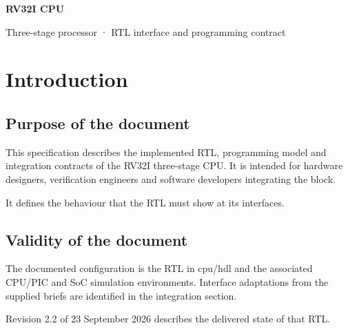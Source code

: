 \documentclass[11pt]{article}
\begin{document}
\begin{titlepage}\vspace*{24mm}
{\Huge\bfseries\color{accent}RV32I CPU\par}\vspace{4mm}{\LARGE Design Specification\par}\vspace{12mm}
{\Large Three-stage processor · RTL interface and programming contract\par}\vfill
{}\end{titlepage}
\tableofcontents
\clearpage
\section{Introduction}

\subsection{Purpose of the document}
\noindent This specification describes the implemented RTL, programming model and integration contracts of the RV32I three-stage CPU. It is intended for hardware designers, verification engineers and software developers integrating the block.\par\medskip
\noindent It defines the behaviour that the RTL must show at its interfaces.\par\medskip

\subsection{Validity of the document}
\noindent The documented configuration is the RTL in cpu/hdl and the associated CPU/PIC and SoC simulation environments. Interface adaptations from the supplied briefs are identified in the integration section.\par\medskip
\noindent Revision 2.2 of 23 September 2026 describes the delivered state of that RTL.\par\medskip

\end{document}
